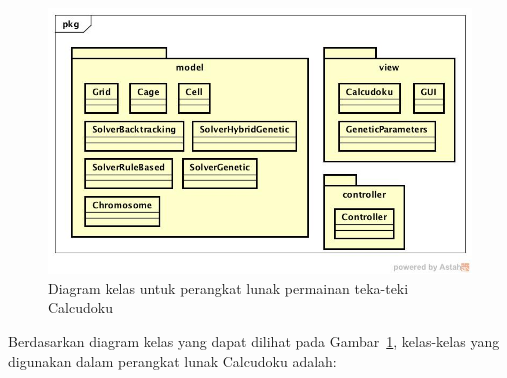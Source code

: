 \begin{figure}
\centering
\captionsetup{justification=centering}
\includegraphics[scale=0.5]{Gambar/Analisis/DiagramKelas.jpg}
\caption[Diagram kelas untuk perangkat lunak permainan teka-teki Calcudoku]{Diagram kelas untuk perangkat lunak permainan teka-teki Calcudoku}
\label{fig:analisiskelas}
\end{figure}

Berdasarkan diagram kelas yang dapat dilihat pada Gambar~\ref{fig:analisiskelas}, kelas-kelas yang digunakan dalam perangkat lunak Calcudoku adalah:

